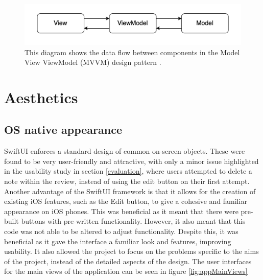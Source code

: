 \documentclass{l4proj}
\begin{document}
\begin{figure}
    \centering
    \includegraphics[scale=0.5]{images/MVVMDataFlow.png}    
    \caption{This diagram shows the data flow between components in the Model View ViewModel (MVVM) design pattern 
    \citep{bulavin_modern_2020}.}
    \label{fig:MVVMDataFlow} 
\end{figure}


\section{Aesthetics}

\subsection{OS native appearance}

SwiftUI enforces a standard design of common on-screen objects. These were found to be very user-friendly and attractive, with only a minor issue highlighted in the usability study in section \ref{evaluation}, where users attempted to delete a note within the review, instead of using the edit button on their first attempt. Another advantage of the SwiftUI framework is that it allows for the creation of existing iOS features, such as the Edit button, to give a cohesive and familiar appearance on iOS phones. This was beneficial as it meant that there were pre-built buttons with pre-written functionality. However, it also meant that this code was not able to be altered to adjust functionality. Despite this, it was beneficial as it gave the interface a familiar look and features, improving usability. It also allowed the project to focus on the problems specific to the aims of the project, instead of the detailed aspects of the design. The user interfaces for the main views of the application can be seen in figure \ref{fig:appMainViews}
\end{document}
